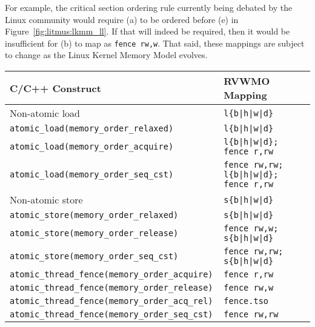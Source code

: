 For example, the critical section ordering rule currently being debated by the Linux community would require (a) to be ordered before (e) in Figure~\ref{fig:litmus:lkmm_ll}.
If that will indeed be required, then it would be insufficient for (b) to map as {\tt fence rw,w}.
That said, these mappings are subject to change as the Linux Kernel Memory Model evolves.

\begin{table}[h!]
  \centering
  \begin{tabular}{|l|l|}
    \hline
    C/C++ Construct                            & RVWMO Mapping \\
    \hline
    \hline
    Non-atomic load                            & \tt l\{b|h|w|d\}               \\
    \hline
    \tt atomic\_load(memory\_order\_relaxed)   & \tt l\{b|h|w|d\}               \\
    \hline
    \tt atomic\_load(memory\_order\_acquire)   & \tt l\{b|h|w|d\}; fence r,rw    \\
    \hline
    \tt atomic\_load(memory\_order\_seq\_cst)  & \tt fence rw,rw; l\{b|h|w|d\}; fence r,rw       \\
    \hline
    \hline
    Non-atomic store                           & \tt s\{b|h|w|d\}               \\
    \hline
    \tt atomic\_store(memory\_order\_relaxed)  & \tt s\{b|h|w|d\}               \\
    \hline
    \tt atomic\_store(memory\_order\_release)  & \tt fence rw,w; s\{b|h|w|d\}  \\
    \hline
    \tt atomic\_store(memory\_order\_seq\_cst) & \tt fence rw,rw; s\{b|h|w|d\} \\
    \hline
    \hline
    \tt atomic\_thread\_fence(memory\_order\_acquire)  & \tt fence r,rw \\
    \hline
    \tt atomic\_thread\_fence(memory\_order\_release)  & \tt fence rw,w \\
    \hline
    \tt atomic\_thread\_fence(memory\_order\_acq\_rel) & {\tt fence.tso} \\
    \hline
    \tt atomic\_thread\_fence(memory\_order\_seq\_cst) & \tt fence rw,rw \\
    \hline
  \end{tabular}

~


\end{table}
